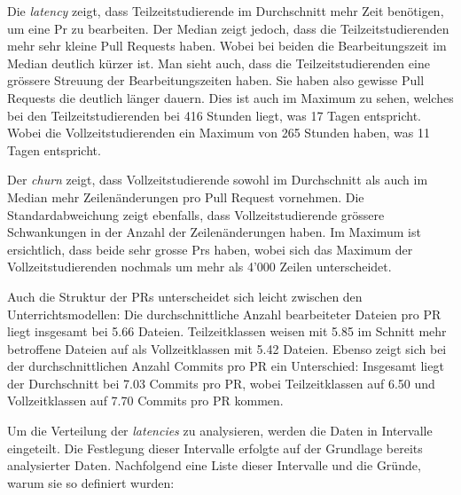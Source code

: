 Die \textit{latency} zeigt, dass Teilzeitstudierende im Durchschnitt mehr Zeit benötigen, um eine Pr zu bearbeiten. Der Median zeigt jedoch, dass die Teilzeitstudierenden mehr sehr kleine Pull Requests haben. Wobei bei beiden die Bearbeitungszeit im Median deutlich kürzer ist. Man sieht auch, dass die Teilzeitstudierenden eine grössere Streuung der Bearbeitungszeiten haben. Sie haben also gewisse Pull Requests die deutlich länger dauern. Dies ist auch im Maximum zu sehen, welches bei den Teilzeitstudierenden bei 416 Stunden liegt, was 17 Tagen entspricht. Wobei die Vollzeitstudierenden ein Maximum von 265 Stunden haben, was 11 Tagen entspricht.

Der \textit{churn} zeigt, dass Vollzeitstudierende sowohl im Durchschnitt als auch im Median mehr Zeilenänderungen pro Pull Request vornehmen. Die Standardabweichung zeigt ebenfalls, dass Vollzeitstudierende grössere Schwankungen in der Anzahl der Zeilenänderungen haben. Im Maximum ist ersichtlich, dass beide sehr grosse Prs haben, wobei sich das Maximum der Vollzeitstudierenden nochmals um mehr als 4'000 Zeilen unterscheidet.

Auch die Struktur der PRs unterscheidet sich leicht zwischen den Unterrichtsmodellen: Die durchschnittliche Anzahl bearbeiteter Dateien pro PR liegt insgesamt bei 5.66 Dateien. Teilzeitklassen weisen mit 5.85 im Schnitt mehr betroffene Dateien auf als Vollzeitklassen mit 5.42 Dateien. Ebenso zeigt sich bei der durchschnittlichen Anzahl Commits pro PR ein Unterschied: Insgesamt liegt der Durchschnitt bei 7.03 Commits pro PR, wobei Teilzeitklassen auf 6.50 und Vollzeitklassen auf 7.70 Commits pro PR kommen.

Um die Verteilung der \textit{latencies} zu analysieren, werden die Daten in Intervalle eingeteilt. Die Festlegung dieser Intervalle erfolgte auf der Grundlage bereits analysierter Daten. Nachfolgend eine Liste dieser Intervalle und die Gründe, warum sie so definiert wurden: 

